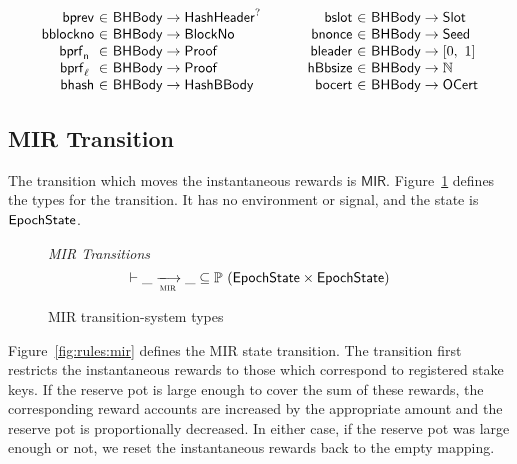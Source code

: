\begin{figure*}[htb]
\begin{equation*}
\begin{array}{r@{~\in~}l@{~~~~~~~~~~}r@{~\in~}lr}
      \fun{bprev} & \BHBody \to \HashHeader^? &
      \fun{bslot} & \BHBody \to \Slot \\
      \fun{bblockno} & \BHBody \to \BlockNo &
      \fun{bnonce} & \BHBody \to \Seed \\
      \fun{\bprfn{}} & \BHBody \to \Proof &
      \fun{bleader} & \BHBody \to \unitInterval \\
      \fun{\bprfl{}} & \BHBody \to \Proof &
      \fun{hBbsize} & \BHBody \to \N \\
      \fun{bhash} & \BHBody \to \HashBBody &
      \fun{bocert} & \BHBody \to \OCert \\
    \end{array}
  \end{equation*}
  \caption{Block Definitions}
  \label{fig:defs:blocks}
\end{figure*}

\clearpage

\subsection{MIR Transition}
\label{sec:mir-trans}

The transition which moves the instantaneous rewards is $\mathsf{MIR}$.
Figure~\ref{fig:ts-types:mir} defines the types for the transition.
It has no environment or signal, and the state is $\mathsf{EpochState}$.

\begin{figure}
  \emph{MIR Transitions}
  \begin{equation*}
    \vdash \var{\_} \trans{mir}{} \var{\_} \subseteq
    \powerset (\EpochState \times \EpochState)
  \end{equation*}
  \caption{MIR transition-system types}
  \label{fig:ts-types:mir}
\end{figure}

Figure~\ref{fig:rules:mir} defines the MIR state transition.
The transition first restricts the instantaneous rewards to those which
correspond to registered stake keys.
If the reserve pot is large enough to cover the sum of these rewards,
the corresponding reward accounts are increased by the appropriate amount
and the reserve pot is proportionally decreased.
In either case, if the reserve pot was large enough or not,
we reset the instantaneous rewards back to the empty mapping.

